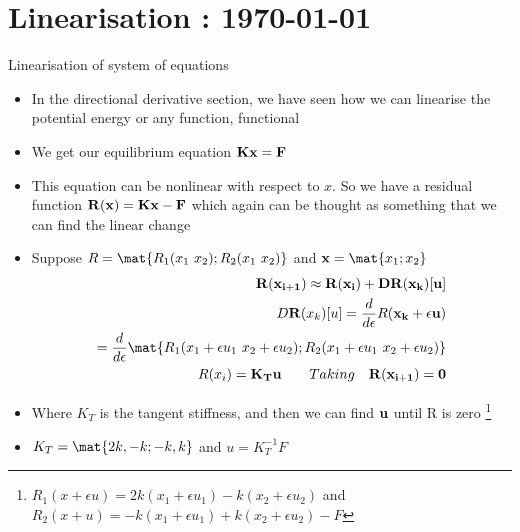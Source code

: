 




	\tableofcontents
\section{Linearisation : \today}

\begin{frame}{Linearisation of system of equations}
	\begin{itemize}
		\item  In the directional derivative section, we have seen how we can linearise the potential energy or any function, functional
		\item We get our equilibrium equation $\mathbf{Kx = F}$
		\item This equation can be nonlinear with respect to $x$. So we have a residual function  $\mathbf{R(x)= Kx - F}$ which again can be thought as something that we can find the linear change
	\end{itemize}
\end{frame}

\begin{frame}
	\begin{itemize}
		\item Suppose $R = \mat{{R_1(x_1~x_2)};R_2(x_1~x_2)}$ and $\ve{x} = \mat{x_1;x_2}$
		\begin{align*}
		\ve{R(x_{i+1}) \approx R(x_{i}) + D{R}{(x_k)}[u]} \\
		D{\ve{R} }{(x_k)}[u]  = \frac{d}{d \epsilon} R(\ve{x_k} + \epsilon \ve{u})\\
		= \frac{d}{d \epsilon}\mat{{R_1(x_1+ \epsilon u_1~x_2+   \epsilon u_2)};R_2(x_1+ \epsilon u_1~x_2+ \epsilon u_2)}\\
		R(x_{i})= \ve{K_Tu}  \qquad Taking \quad \ve{R(x_{i+1}) = 0}
		\end{align*}
		\item Where $K_T$ is the tangent stiffness, and then we can find $\mathbf{u}$ until R is zero \footnote{$R_1(x+\epsilon u) = 2k(x_1+\epsilon u_1) - k(x_2+\epsilon u_2)$ and $R_2(x+u) =-k(x_1+\epsilon u_1) + k(x_2+\epsilon u_2) - F$ }
		\item $K_T = \mat{2k,-k;-k,k}$ and $u = K_T^{-1}F$
		
	\end{itemize}
\end{frame}
